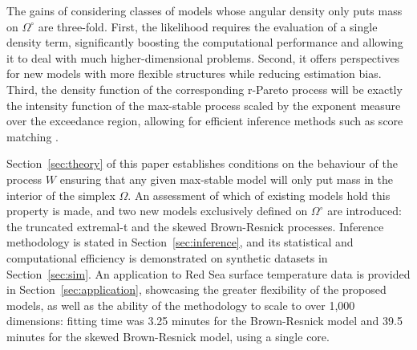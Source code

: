 \documentclass[lineno]{biometrika}
\begin{document}
The gains of considering classes of models whose angular density only puts mass on $\Omega^\circ$ are three-fold. 
First, the likelihood requires the evaluation of a single density term, significantly boosting the computational performance and allowing it to deal with much higher-dimensional problems. Second, it offers perspectives for new models with more flexible structures while reducing estimation bias. Third, 
the density function of the corresponding r-Pareto process will be exactly the intensity function of the max-stable process scaled by the exponent measure over the exceedance region, allowing for efficient inference methods such as score matching \citep[see][for the Brown-Resnick model]{deFondeville.Davison:2018}. 

Section~\ref{sec:theory} of this paper establishes conditions on the behaviour of the process $W$ ensuring that any given max-stable model will only put mass in the interior of the simplex $\Omega$. An assessment of which of 
existing
models hold this property is made, and two new models exclusively defined on $\Omega^\circ$ are introduced: the truncated extremal-t and the skewed Brown-Resnick processes. Inference methodology is stated in Section~\ref{sec:inference}, and its statistical and computational efficiency is demonstrated on synthetic datasets in Section~\ref{sec:sim}. An application to Red Sea surface temperature data is provided in Section~\ref{sec:application}, showcasing the greater flexibility of the proposed models, as well as the ability of the methodology to scale to over 1,000 dimensions: fitting time was 3.25 minutes for the Brown-Resnick model and 39.5 minutes for the skewed Brown-Resnick model, using a single core.   
\end{document}
